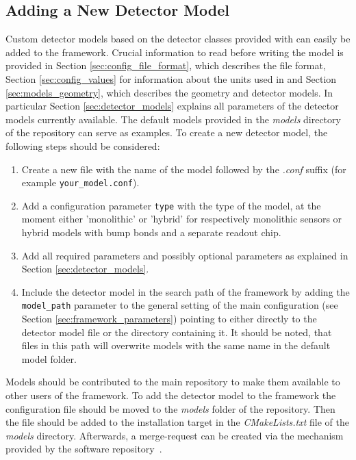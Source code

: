 \subsection{Adding a New Detector Model}
\label{sec:adding_detector_model}
Custom detector models based on the detector classes provided with \apsq can easily be added to the framework.
Crucial information to read before writing the model is provided in Section \ref{sec:config_file_format}, which  describes the file format, Section \ref{sec:config_values} for information about the units used in \apsq and Section \ref{sec:models_geometry}, which describes the geometry and detector models.
In particular Section \ref{sec:detector_models} explains all parameters of the detector models currently available.
The default models provided in the \textit{models} directory of the repository can serve as examples.
To create a new detector model, the following steps should be considered:
\begin{enumerate}
\item Create a new file with the name of the model followed by the \textit{.conf} suffix (for example \texttt{your\_model.conf}).
\item Add a configuration parameter \texttt{type} with the type of the model, at the moment either 'monolithic' or 'hybrid' for respectively monolithic sensors or hybrid models with bump bonds and a separate readout chip.
\item Add all required parameters and possibly optional parameters as explained in Section \ref{sec:detector_models}.
\item Include the detector model in the search path of the framework by adding the \texttt{model\_path} parameter to the general setting of the main configuration (see Section \ref{sec:framework_parameters}) pointing to either directly to the detector model file or the directory containing it. It should be noted, that files in this path will overwrite models with the same name in the default model folder.
\end{enumerate}

Models should be contributed to the main repository to make them available to other users of the framework.
To add the detector model to the framework the configuration file should be moved to the \textit{models} folder of the repository.
Then the file should be added to the installation target in the \textit{CMakeLists.txt} file of the \textit{models} directory.
Afterwards, a merge-request can be created via the mechanism provided by the software repository~\cite{ap2-repo}.
